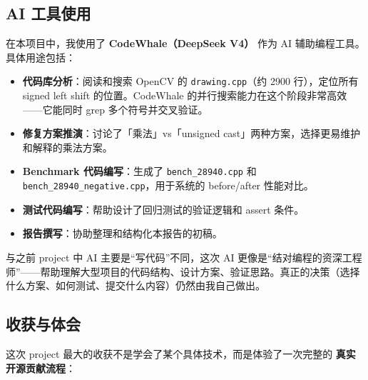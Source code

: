 \documentclass[12pt,a4paper]{article}
\begin{document}
\subsection{AI 工具使用}

在本项目中，我使用了 \textbf{CodeWhale（DeepSeek V4）} 作为 AI 辅助编程工具。具体用途包括：

\begin{itemize}[leftmargin=*]
    \item \textbf{代码库分析}：阅读和搜索 OpenCV 的 \texttt{drawing.cpp}（约 2900 行），定位所有 signed left shift 的位置。CodeWhale 的并行搜索能力在这个阶段非常高效——它能同时 grep 多个符号并交叉验证。
    \item \textbf{修复方案推演}：讨论了「乘法」vs「unsigned cast」两种方案，选择更易维护和解释的乘法方案。
    \item \textbf{Benchmark 代码编写}：生成了 \texttt{bench\_28940.cpp} 和 \texttt{bench\_28940\_negative.cpp}，用于系统的 before/after 性能对比。
    \item \textbf{测试代码编写}：帮助设计了回归测试的验证逻辑和 assert 条件。
    \item \textbf{报告撰写}：协助整理和结构化本报告的初稿。
\end{itemize}

与之前 project 中 AI 主要是“写代码”不同，这次 AI 更像是“结对编程的资深工程师”——帮助理解大型项目的代码结构、设计方案、验证思路。真正的决策（选择什么方案、如何测试、提交什么内容）仍然由我自己做出。

\subsection{收获与体会}

这次 project 最大的收获不是学会了某个具体技术，而是体验了一次完整的 \textbf{真实开源贡献流程}：
\end{document}
